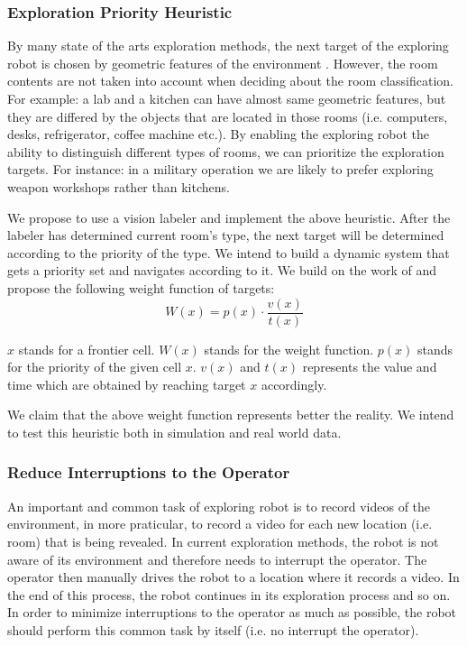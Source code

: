 \documentclass[a4paper,10pt]{article}
\begin{document}
\subsubsection{Exploration Priority Heuristic}

By many state of the arts exploration methods, the next target of the exploring
robot is chosen by geometric features of the environment
\cite{stachniss_speeding-up_2006}. However, the room contents are not
taken into account when deciding about the room classification. For example:
a lab and a kitchen can have almost same geometric features, but they are
differed by the objects that are located in those rooms (i.e. computers, desks, 
refrigerator, coffee machine etc.). By enabling the exploring robot the ability
to distinguish different types of rooms, we can prioritize the exploration
targets. For instance: in a military operation we are likely to prefer exploring
weapon workshops rather than kitchens. 

We propose to use a vision labeler and implement the above heuristic.
After the labeler has determined current room's type, the next target will
be determined according to the priority of the type. We intend to build a
dynamic system that gets a priority set and navigates according to it. We
build on the work of \cite{sawhney_fast_2009} and propose the following weight
function of targets: $$W(x) = {p(x)} \cdot \frac {v(x)}{t(x)}$$

$x$ stands for a frontier cell. $W(x)$ stands for the weight function. $p(x)$
stands for the priority of the given cell $x$. $v(x)$ and $t(x)$ represents the
value and time which are obtained by reaching target $x$ accordingly. 
   
We claim that the above weight function represents better the reality. We
intend to test this heuristic both in simulation and real world data.


\subsubsection{Reduce Interruptions to the Operator}
\label{section:ReduceInterruptions}
An important and common task of exploring robot is to record videos of the
environment, in more praticular, to record a video for each new location (i.e.
room) that is being revealed. In current exploration methods, the robot is not
aware of its environment and therefore needs to interrupt the operator. The 
operator then manually drives the robot to a location where it records a
video. In the end of this process, the robot continues in its exploration
process and so on. In order to minimize interruptions to the operator as much
as possible, the robot should perform this common task by itself (i.e. no
interrupt the operator).
\end{document}
